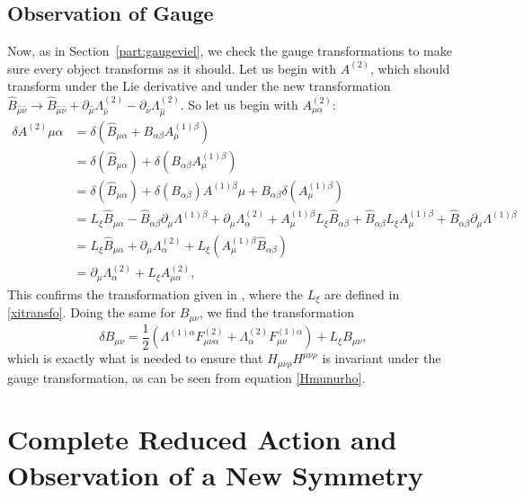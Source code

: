 \documentclass{article}
\begin{document}
\subsection{Observation of Gauge} \label{part:Bgauge}
Now, as in Section~\ref{part:gaugeviel}, we check the gauge transformations to make sure every object transforms as it should.
Let us begin with $A^{(2)}$, which should transform under the Lie derivative and under the new transformation $\hat B_{\hat \mu \hat \nu} \rightarrow \hat B_{\hat \mu \hat \nu} + \partial_{\hat\mu} \Lambda^{(2)}_{\hat\nu} - \partial_{\hat\nu} \Lambda^{(2)}_{\hat\mu}$. So let us begin
with $A^{(2)}_{\mu \alpha}$:
\begin{equation} 
    \begin{aligned}
        \delta A^{(2)}{\mu \alpha}&= \delta(\hat B_{\mu \alpha}+ B_{\alpha\beta}A^{(1)\beta}_\mu)\\
        &=\delta(\hat B_{\mu \alpha})+ \delta(B_{\alpha\beta}A^{(1)\beta}_\mu)\\
        &= \delta(\hat B_{\mu \alpha})+ \delta(B_{\alpha\beta})A^{(1)\beta}\mu+ B_{\alpha\beta}\delta(A^{(1)\beta}_\mu)\\
        &= L_{\xi} \hat B_{\mu \alpha} - \hat B_{ \alpha \beta } \partial_\mu \Lambda^{(1)\beta} + \partial_\mu \Lambda^{(2)}_{\alpha}+A^{(1)\beta}_\mu L_{\xi} \hat B_{ \alpha \beta } +   \hat B_{ \alpha \beta } L_{\xi} A^{(1)\beta}_\mu + \hat B_{ \alpha \beta } \partial_\mu \Lambda^{(1)\beta}\\
        &= L_{\xi} \hat B_{\mu \alpha} + \partial_\mu \Lambda^{(2)}_{\alpha}+L_{\xi} (A^{(1)\beta}_\mu \hat B_{ \alpha \beta })\\
        &=\partial_\mu \Lambda^{(2)}_{\alpha} +L_\xi A^{(2)}_{\mu \alpha},
    \end{aligned}
\end{equation}
This confirms the transformation given in \cite{maharana1993noncompact}, where the $L_{\xi}$ are defined in \eqref{xitransfo}.
Doing the same for $B_{\mu \nu}$, we find the transformation
\begin{equation}
    \delta B_{\mu \nu} = \frac{1}{2}(\Lambda^{(1)\alpha}F^{(2)}_{\mu \nu \alpha} + \Lambda^{(2)}_{\alpha}F^{(1)\alpha}_{\mu \nu}) + L_{\xi} B_{\mu \nu},
\end{equation}
which is exactly what is needed to ensure that $H_{\mu \nu \rho} H^{\mu \nu \rho}$ is invariant under the gauge transformation, as can be seen from equation \eqref{Hmunurho}.

\section{Complete Reduced Action and Observation of a New Symmetry}
\end{document}
